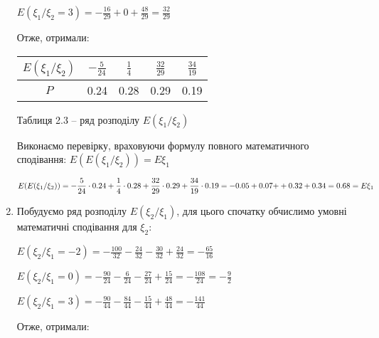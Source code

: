 \documentclass[a4paper, 20pt, titlepage]{article}
\begin{document}
\begin{spacing}{1.4}
\begin{enumerate}
\vspace{1mm}

$E\left(\xi_1 / \xi_2 = 3 \right) = \displaystyle{-\frac{16}{29} + 0 + \frac{48}{29} = \frac{32}{29} }$

\vspace{4mm}
Отже, отримали:

\begin{center}
\begin{tabular}{|c|c|c|c|c|}
\hline
$E(\xi_1/\xi_2)$ & $-\frac{5}{24}$ & $\frac{1}{4}$ & $\frac{32}{29}$ & $\frac{34}{19}$ \\ \hline
$P$ & 0.24 & 0.28 & 0.29 & 0.19 \\ \hline
\end{tabular}

\vspace{1mm}
Таблиця 2.3 -- ряд розподілу $E(\xi_1/\xi_2)$
\end{center}

Виконаємо перевірку, враховуючи формулу повного математичного сподівання: $E(E(\xi_1/\xi_2)) = E \xi_1$

\vspace{1mm}
\begin{spacing}{2}
$E(E(\xi_1/\xi_2)) = \displaystyle{-\frac{5}{24} \cdot 0.24 + \frac{1}{4} \cdot 0.28 + \frac{32}{29} \cdot 0.29 + \frac{34}{19} \cdot 0.19= -0.05 + 0.07 +} \\ + 0.32 + 0.34 = 0.68 = E \xi_1$
\end{spacing}


\item Побудуємо ряд розподілу $E (\xi_2 / \xi_1)$, для цього спочатку обчислимо умовні математичні сподівання для $\xi_2$:

\vspace{3mm}

$E(\xi_2 / \xi_1 = -2) = \displaystyle{-\frac{100}{32} - \frac{24}{32} - \frac{30}{32} + \frac{24}{32} = - \frac{65}{16}}$

\vspace{1mm}

$E(\xi_2 / \xi_1 = 0) = \displaystyle{-\frac{90}{24} - \frac{6}{24} - \frac{27}{24} + \frac{15}{24} = - \frac{108}{24} = - \frac{9}{2}}$

\vspace{1mm}

$E(\xi_2 / \xi_1 = 3) = \displaystyle{-\frac{90}{44} - \frac{84}{44} - \frac{15}{44} + \frac{48}{44} = - \frac{141}{44}}$


\vspace{4mm}
Отже, отримали:


\end{enumerate}
\end{spacing}
\end{document}
